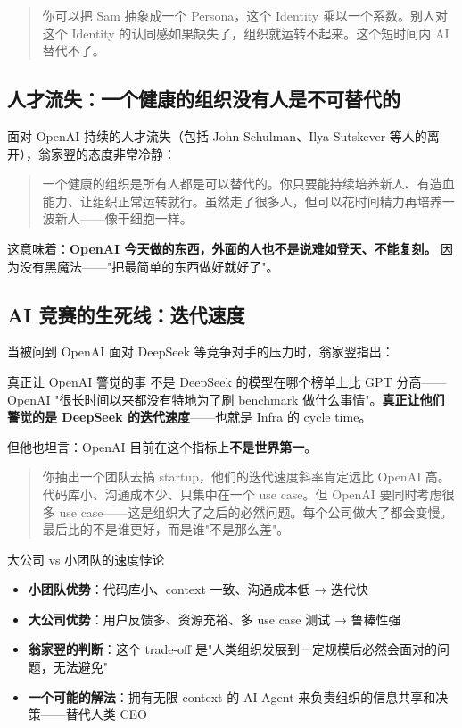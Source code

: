 \documentclass[a4paper]{article}
\begin{document}
\begin{quote}
你可以把 Sam 抽象成一个 Persona，这个 Identity 乘以一个系数。别人对这个 Identity 的认同感如果缺失了，组织就运转不起来。这个短时间内 AI 替代不了。
\end{quote}

\subsection{人才流失：一个健康的组织没有人是不可替代的}

面对 OpenAI 持续的人才流失（包括 John Schulman、Ilya Sutskever 等人的离开），翁家翌的态度非常冷静：

\begin{quote}
一个健康的组织是所有人都是可以替代的。你只要能持续培养新人、有造血能力、让组织正常运转就行。虽然走了很多人，但可以花时间精力再培养一波新人——像干细胞一样。
\end{quote}

这意味着：\textbf{OpenAI 今天做的东西，外面的人也不是说难如登天、不能复刻。} 因为没有黑魔法——"把最简单的东西做好就好了"。

\subsection{AI 竞赛的生死线：迭代速度}

当被问到 OpenAI 面对 DeepSeek 等竞争对手的压力时，翁家翌指出：

\begin{importantbox}{真正让 OpenAI 警觉的事}{
不是 DeepSeek 的模型在哪个榜单上比 GPT 分高——OpenAI "很长时间以来都没有特地为了刷 benchmark 做什么事情"。\textbf{真正让他们警觉的是 DeepSeek 的迭代速度}——也就是 Infra 的 cycle time。
}
\end{importantbox}

但他也坦言：OpenAI 目前在这个指标上\textbf{不是世界第一}。

\begin{quote}
你抽出一个团队去搞 startup，他们的迭代速度斜率肯定远比 OpenAI 高。代码库小、沟通成本少、只集中在一个 use case。但 OpenAI 要同时考虑很多 use case——这是组织大了之后的必然问题。每个公司做大了都会变慢。最后比的不是谁更好，而是谁"不是那么差"。
\end{quote}

\begin{knowledgebox}{大公司 vs 小团队的速度悖论}

\begin{itemize}
\item \textbf{小团队优势}：代码库小、context 一致、沟通成本低 → 迭代快
\item \textbf{大公司优势}：用户反馈多、资源充裕、多 use case 测试 → 鲁棒性强
\item \textbf{翁家翌的判断}：这个 trade-off 是"人类组织发展到一定规模后必然会面对的问题，无法避免"
\item \textbf{一个可能的解法}：拥有无限 context 的 AI Agent 来负责组织的信息共享和决策——替代人类 CEO
\end{itemize}
\end{knowledgebox}
\end{document}
